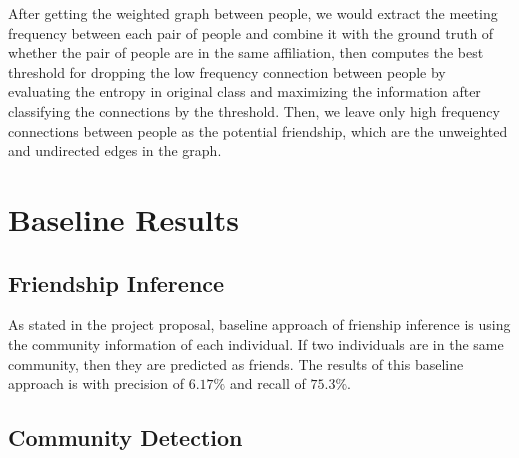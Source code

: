 \documentclass[11pt]{article}
\begin{document}
After getting the weighted graph between people, we would extract the meeting frequency between each pair of people and combine it with the ground truth of whether the pair of people are in the same affiliation, then computes the best threshold for dropping the low frequency connection between people by evaluating the entropy in original class and maximizing the information after classifying the connections by the threshold. Then, we leave only high frequency connections between people as the potential friendship, which are the unweighted and undirected edges in the graph.


\section{Baseline Results}
\subsection{Friendship Inference}
As stated in the project proposal, baseline approach of frienship inference is using the community information of each individual. If two individuals are in the same community, then they are predicted as friends. The results of this baseline approach is with precision of \(6.17\%\) and recall of \(75.3\%\).
\subsection{Community Detection}



%
%

\end{document}
